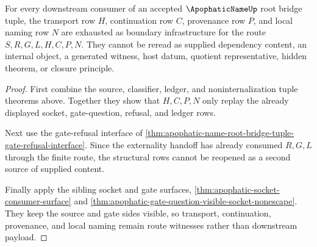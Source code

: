 \begin{theorem}
\label{thm:apophatic-name-root-bridge-tuple-transport-naming-exhaustion}
For every downstream consumer of an accepted $\ApophaticNameUp$ root bridge tuple, the transport row $H$, continuation row $C$, provenance row $P$, and local naming row $N$ are exhausted as boundary infrastructure for the route $S,R,G,L,H,C,P,N$. They cannot be reread as supplied dependency content, an internal object, a generated witness, host datum, quotient representative, hidden theorem, or closure principle.
\end{theorem}
\begin{proof}
First combine the source, classifier, ledger, and noninternalization tuple theorems above. Together they show that $H,C,P,N$ only replay the already displayed socket, gate-question, refusal, and ledger rows.

Next use the gate-refusal interface of \autoref{thm:apophatic-name-root-bridge-tuple-gate-refusal-interface}. Since the externality handoff has already consumed $R,G,L$ through the finite route, the structural rows cannot be reopened as a second source of supplied content.

Finally apply the sibling socket and gate surfaces, \autoref{thm:apophatic-socket-consumer-surface} and \autoref{thm:apophatic-gate-question-visible-socket-nonescape}. They keep the source and gate sides visible, so transport, continuation, provenance, and local naming remain route witnesses rather than downstream payload.
\end{proof}

